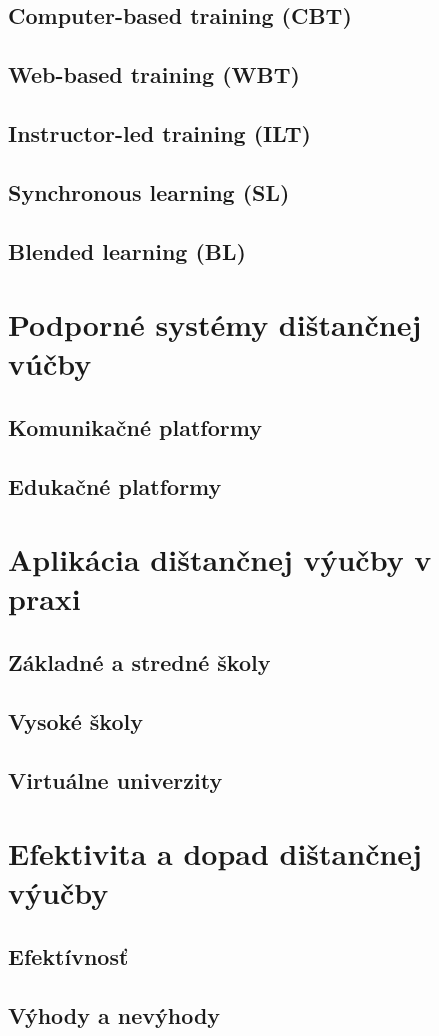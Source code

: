 \documentclass[10pt,oneside,slovak,a4paper]{article}
\begin{document}
\subsection{Computer-based training (CBT)}
\subsection{Web-based training (WBT)}
\subsection{Instructor-led training (ILT)}
\subsection{Synchronous learning (SL)}
\subsection{Blended learning (BL)}


\section{Podporné systémy dištančnej vúčby}
\subsection{Komunikačné platformy}
\subsection{Edukačné platformy}

\section{Aplikácia dištančnej výučby v praxi}
\subsection{Základné a stredné školy}
\subsection{Vysoké školy}
\subsection{Virtuálne univerzity}

\section{Efektivita a dopad dištančnej výučby}
\subsection{Efektívnosť}
\subsection{Výhody a nevýhody}







\end{document}
